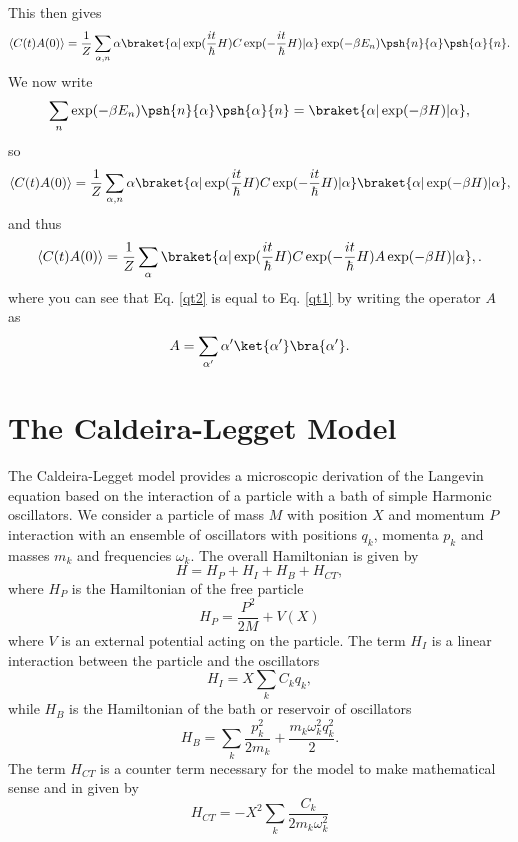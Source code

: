 This then gives
\begin{equation}
\langle C(t) A(0)\rangle= \frac{1}{Z}\sum_{\alpha,n}  \alpha  \braket{\alpha |\exp(\frac{it}{\hbar}H) C \exp(-\frac{it}{\hbar}H)|\alpha}\exp(-\beta E_n)\psh{n}{\alpha}\psh{\alpha}{n}.
\end{equation}
We now write
\begin{equation}
\sum_n \exp(-\beta E_n)\psh{n}{\alpha}\psh{\alpha}{n}= \braket{\alpha |\exp(-\beta H)|\alpha},
\end{equation}
so
\begin{equation}
\langle C(t) A(0)\rangle= \frac{1}{Z}\sum_{\alpha,n}  \alpha  \braket{\alpha |\exp(\frac{it}{\hbar}H) C \exp(-\frac{it}{\hbar}H)|\alpha}\braket{\alpha |\exp(-\beta H)|\alpha},\label{qt2}
\end{equation}
and thus
\begin{eqnarray}
\langle C(t) A(0)\rangle= \frac{1}{Z}\sum_{\alpha}   \braket{\alpha |\exp(\frac{it}{\hbar}H) C \exp(-\frac{it}{\hbar}H)A\exp(-\beta H)|\alpha},\label{qt1}.
\end{eqnarray}
where you can see that Eq. \eqref{qt2} is equal to Eq. \eqref{qt1} by writing the operator $A$ as
\begin{equation}
A = \sum_{\alpha'}\alpha'\ket{\alpha'}\bra{\alpha'}.
\end{equation}
 \section{The Caldeira-Legget Model}
The Caldeira-Legget model provides a microscopic derivation of the Langevin equation 
based on the interaction of a particle with a bath of simple Harmonic oscillators. We consider a particle of mass $M$ with position $X$ and momentum $P$ interaction with an ensemble of oscillators with positions $q_k$, momenta $p_k$ and masses $m_k$ and frequencies $\omega_k$. The overall Hamiltonian is given by
\begin{equation}
H= H_P + H_I + H_B + H_{CT},
\end{equation}
where $H_P$ is the Hamiltonian of the free particle
\begin{equation}
H_P = \frac{P^2}{2M} + V(X)
\end{equation}
where $V$ is an external potential acting on the particle. The term $H_I$ is a linear  interaction between the particle and the oscillators
\begin{equation}
H_I = X\sum_k C_k q_k,
\end{equation}
while $H_B$ is the Hamiltonian of the bath or reservoir of oscillators
\begin{equation}
H_B = \sum_k \frac{p_k^2}{2m_k} + \frac{m_k \omega_k^2 q_k^2}{2}.
\end{equation}
The term $H_{CT}$ is a counter term necessary for the model to make mathematical sense and in given by
\begin{equation}
H_{CT} = -X^2 \sum_k \frac{C_k}{2m_k \omega_k^2}
\end{equation}
